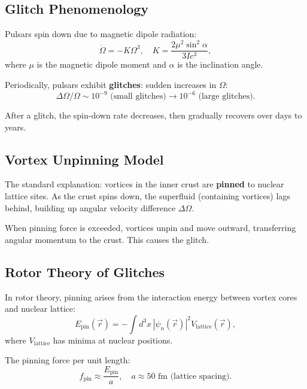 \documentclass[12pt,a4paper]{article}
\theoremstyle{definition}
\theoremstyle{remark}
\begin{document}
\subsection{Glitch Phenomenology}

Pulsars spin down due to magnetic dipole radiation:
\begin{equation}
\dot{\Omega} = -K \Omega^3, \quad K = \frac{2\mu^2 \sin^2 \alpha}{3Ic^3},
\end{equation}
where $\mu$ is the magnetic dipole moment and $\alpha$ is the inclination angle.

Periodically, pulsars exhibit \textbf{glitches}: sudden increases in $\Omega$:
\begin{equation}
\Delta \Omega / \Omega \sim 10^{-9} \text{ (small glitches)} \to 10^{-6} \text{ (large glitches)}.
\end{equation}

After a glitch, the spin-down rate decreases, then gradually recovers over days to years.

\subsection{Vortex Unpinning Model}

The standard explanation: vortices in the inner crust are \textbf{pinned} to nuclear lattice sites. As the crust spins down, the superfluid (containing vortices) lags behind, building up angular velocity difference $\Delta \Omega$.

When pinning force is exceeded, vortices unpin and move outward, transferring angular momentum to the crust. This causes the glitch.

\subsection{Rotor Theory of Glitches}

In rotor theory, pinning arises from the interaction energy between vortex cores and nuclear lattice:
\begin{equation}
E_{\text{pin}}(\vec{r}) = -\int d^3x \, |\psi_n(\vec{r})|^2 V_{\text{lattice}}(\vec{r}),
\end{equation}
where $V_{\text{lattice}}$ has minima at nuclear positions.

The pinning force per unit length:
\begin{equation}
f_{\text{pin}} \approx \frac{E_{\text{pin}}}{a}, \quad a \approx 50 \text{ fm (lattice spacing)}.
\end{equation}
\end{document}
